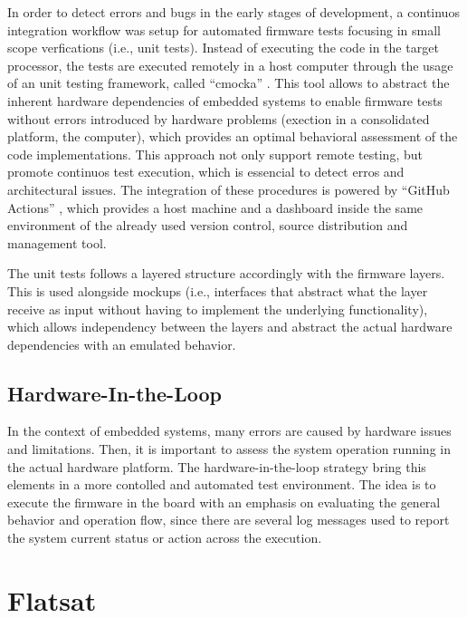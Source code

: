 In order to detect errors and bugs in the early stages of development, a continuos integration workflow was setup for automated firmware tests focusing in small scope verfications (i.e., unit tests). Instead of executing the code in the target processor, the tests are executed remotely in a host computer through the usage of an unit testing framework, called ``cmocka'' \cite{cmocka}. This tool allows to abstract the inherent hardware dependencies of embedded systems to enable firmware tests without errors introduced by hardware problems (exection in a consolidated platform, the computer), which provides an optimal behavioral assessment of the code implementations. This approach not only support remote testing, but promote continuos test execution, which is essencial to detect erros and architectural issues. The integration of these procedures is powered by ``GitHub Actions'' \cite{gh-actions}, which provides a host machine and a dashboard inside the same environment of the already used version control, source distribution and management tool.

The unit tests follows a layered structure accordingly with the firmware layers. This is used alongside mockups (i.e., interfaces that abstract what the layer receive as input without having to implement the underlying functionality), which allows independency between the layers and abstract the actual hardware dependencies with an emulated behavior.

\subsection{Hardware-In-the-Loop}

In the context of embedded systems, many errors are caused by hardware issues and limitations. Then, it is important to assess the system operation running in the actual hardware platform. The hardware-in-the-loop strategy bring this elements in a more contolled and automated test environment. The idea is to execute the firmware in the board with an emphasis on evaluating the general behavior and operation flow, since there are several log messages used to report the system current status or action across the execution.


\section{Flatsat}

